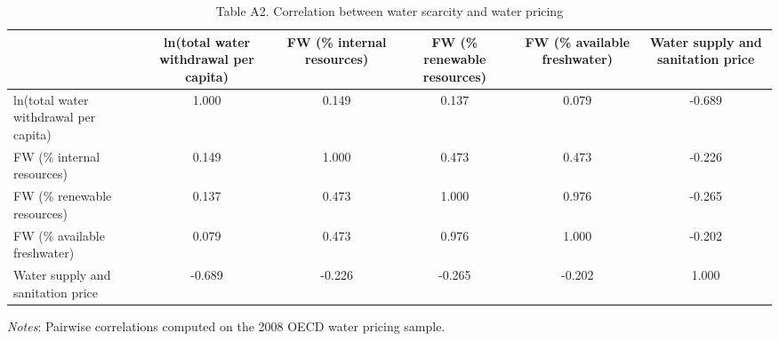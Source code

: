 \begin{table}[htbp]
\centering
\caption{Table A2. Correlation between water scarcity and water pricing}
\small
\begin{tabular}{lccccc}
\hline
 & ln(total water withdrawal per capita) & FW (\% internal resources) & FW (\% renewable resources) & FW (\% available freshwater) & Water supply and sanitation price \\
\hline
ln(total water withdrawal per capita) & 1.000 & 0.149 & 0.137 & 0.079 & -0.689 \\
FW (\% internal resources) & 0.149 & 1.000 & 0.473 & 0.473 & -0.226 \\
FW (\% renewable resources) & 0.137 & 0.473 & 1.000 & 0.976 & -0.265 \\
FW (\% available freshwater) & 0.079 & 0.473 & 0.976 & 1.000 & -0.202 \\
Water supply and sanitation price & -0.689 & -0.226 & -0.265 & -0.202 & 1.000 \\
\hline
\end{tabular}
\vspace{0.5em}
\parbox{0.95\textwidth}{\footnotesize \textit{Notes}: Pairwise correlations computed on the 2008 OECD water pricing sample.}
\end{table}
